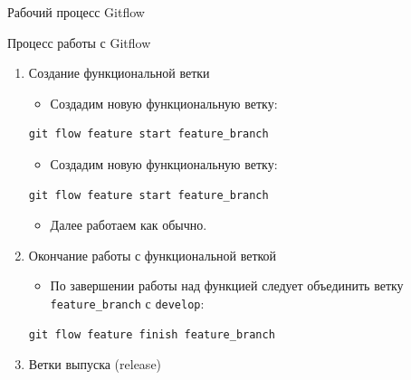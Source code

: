 \documentclass[
  ignorenonframetext,
  aspectratio=169,
  russian,
]{beamer}
\providecommand{\tightlist}{%
  \setlength{\itemsep}{0pt}\setlength{\parskip}{0pt}}
\begin{document}
\begin{frame}[fragile]{Рабочий процесс Gitflow}
\begin{block}{Процесс работы с Gitflow}
\begin{enumerate}[<+->]
\begin{itemize}[<+->]
    \begin{enumerate}[<+->]
    \item
      Создание функциональной ветки

      \begin{itemize}[<+->]
      \tightlist
      \item
        Создадим новую функциональную ветку:
      \end{itemize}

\begin{verbatim}
git flow feature start feature_branch
\end{verbatim}

      \begin{itemize}[<+->]
      \tightlist
      \item
        Создадим новую функциональную ветку:
      \end{itemize}

\begin{verbatim}
git flow feature start feature_branch
\end{verbatim}

      \begin{itemize}[<+->]
      \tightlist
      \item
        Далее работаем как обычно.
      \end{itemize}
    \item
      Окончание работы с функциональной веткой

      \begin{itemize}[<+->]
      \tightlist
      \item
        По завершении работы над функцией следует объединить ветку
        \texttt{feature\_branch} с \texttt{develop}:
      \end{itemize}

\begin{verbatim}
git flow feature finish feature_branch
\end{verbatim}
    \item
      Ветки выпуска (release)


\end{enumerate}
\end{itemize}
\end{enumerate}
\end{block}
\end{frame}
\end{document}
